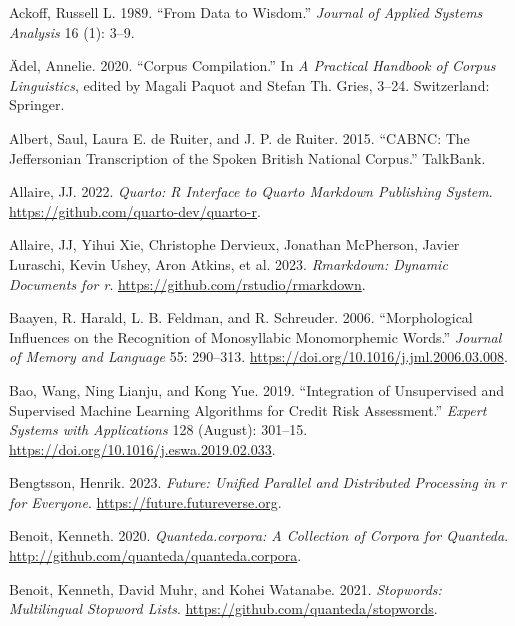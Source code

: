 \documentclass[
  letterpaper,
  DIV=11,
  numbers=noendperiod]{scrreport}
\newlength{\cslhangindent}
\newlength{\cslentryspacingunit} %
\newenvironment{CSLReferences}[2] %
 {%
  \setlength{\parindent}{0pt}
  \ifodd #1
  \let\oldpar\par
  \def\par{\hangindent=\cslhangindent\oldpar}
  \fi
  \setlength{\parskip}{#2\cslentryspacingunit}
 }%
 {}
\theoremstyle{definition}
\theoremstyle{remark}
\begin{document}
\hypertarget{refs}{}
\begin{CSLReferences}{1}{0}
\leavevmode{}%
Ackoff, Russell L. 1989. {``From Data to Wisdom.''} \emph{Journal of
Applied Systems Analysis} 16 (1): 3--9.

\leavevmode{}%
Ädel, Annelie. 2020. {``Corpus Compilation.''} In \emph{A Practical
Handbook of Corpus Linguistics}, edited by Magali Paquot and Stefan Th.
Gries, 3--24. Switzerland: Springer.

\leavevmode{}%
Albert, Saul, Laura E. de Ruiter, and J. P. de Ruiter. 2015. {``CABNC:
The Jeffersonian Transcription of the Spoken British National Corpus.''}
TalkBank.

\leavevmode{}%
Allaire, JJ. 2022. \emph{Quarto: R Interface to Quarto Markdown
Publishing System}. \url{https://github.com/quarto-dev/quarto-r}.

\leavevmode{}%
Allaire, JJ, Yihui Xie, Christophe Dervieux, Jonathan McPherson, Javier
Luraschi, Kevin Ushey, Aron Atkins, et al. 2023. \emph{Rmarkdown:
Dynamic Documents for r}. \url{https://github.com/rstudio/rmarkdown}.

\leavevmode{}%
Baayen, R. Harald, L. B. Feldman, and R. Schreuder. 2006.
{``Morphological Influences on the Recognition of Monosyllabic
Monomorphemic Words.''} \emph{Journal of Memory and Language} 55:
290--313. \url{https://doi.org/10.1016/j.jml.2006.03.008}.

\leavevmode{}%
Bao, Wang, Ning Lianju, and Kong Yue. 2019. {``Integration of
Unsupervised and Supervised Machine Learning Algorithms for Credit Risk
Assessment.''} \emph{Expert Systems with Applications} 128 (August):
301--15. \url{https://doi.org/10.1016/j.eswa.2019.02.033}.

\leavevmode{}%
Bengtsson, Henrik. 2023. \emph{Future: Unified Parallel and Distributed
Processing in r for Everyone}. \url{https://future.futureverse.org}.

\leavevmode{}%
Benoit, Kenneth. 2020. \emph{Quanteda.corpora: A Collection of Corpora
for Quanteda}. \url{http://github.com/quanteda/quanteda.corpora}.

\leavevmode{}%
Benoit, Kenneth, David Muhr, and Kohei Watanabe. 2021. \emph{Stopwords:
Multilingual Stopword Lists}.
\url{https://github.com/quanteda/stopwords}.


\end{CSLReferences}
\end{document}
